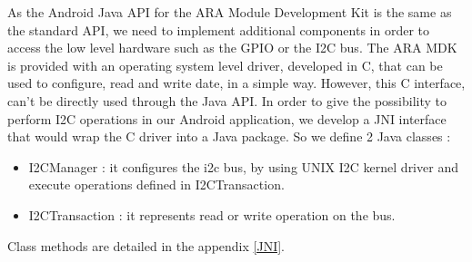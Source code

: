 As the Android Java API for the ARA Module Development Kit is the same as the standard API, we need to implement additional components in order to access the low level hardware such as the GPIO or the I2C bus.
The ARA MDK is provided with an operating system level driver, developed in C, that can be used to configure, read and write date, in a simple way.
However, this C interface, can't be directly used through the Java API. In order to give the possibility to perform I2C operations in our Android application, we develop a JNI interface that would wrap the C driver into a Java package.
So we define 2 Java classes : 
\begin{itemize}
\item I2CManager : it configures the i2c bus, by using UNIX I2C kernel driver and execute operations defined in I2CTransaction.
\item I2CTransaction : it represents read or write operation on the bus.
\end{itemize}

Class methods are detailed in the appendix \ref{JNI}.
